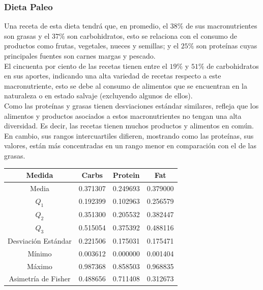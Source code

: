 \documentclass[12pt,a4paper]{article}
\begin{document}
        \subsubsection{Dieta Paleo}

            Una receta de esta dieta tendrá que, en promedio, el $38\%$ de sus 
            macronutrientes son grasas y el $37\%$ son carbohidratos, esto se 
            relaciona con el consumo de productos como frutas, vegetales, nueces 
            y semillas; y el $25\%$ son proteínas cuyas principales fuentes son 
            carnes margas y pescado.\\

            El cincuenta por ciento de las recetas tienen entre el $19\%$ y $51\%$ 
            de carbohidratos en sus aportes, indicando una alta variedad de recetas 
            respecto a este macronutriente, esto se debe al consumo de alimentos que 
            se encuentran en la naturaleza o en estado salvaje (excluyendo algunos 
            de ellos).\\

            Como las proteínas y grasas tienen desviaciones estándar similares, refleja 
            que los alimentos y productos asociados a estos macronutrientes no tengan 
            una alta diversidad. Es decir, las recetas tienen muchos productos y alimentos 
            en común. En cambio, sus rangos intercuartiles difieren, mostrando como 
            las proteínas, sus valores, están más concentradas en un rango menor en 
            comparación con el de las grasas.

            \begin{center}
                \begin{tabular}{| c | c c c |}
                    \toprule
                    Medida & Carbs & Protein & Fat \\
                    \midrule
                    Media               & 0.371307 & 0.249693 & 0.379000  \\
                    $Q_1$               & 0.192399 & 0.102963 & 0.256579  \\
                    $Q_2$               & 0.351300 & 0.205532 & 0.382447  \\
                    $Q_3$               & 0.515054 & 0.375392 & 0.488116  \\
                    Desviación Estándar & 0.221506 & 0.175031 & 0.175471  \\
                    Mínimo              & 0.003612 & 0.000000 & 0.001404  \\
                    Máximo              & 0.987368 & 0.858503 & 0.968835  \\
                    Asimetría de Fisher & 0.488656 & 0.711408 & 0.312673  \\
                    \bottomrule
                \end{tabular}
            \end{center}
\end{document}

